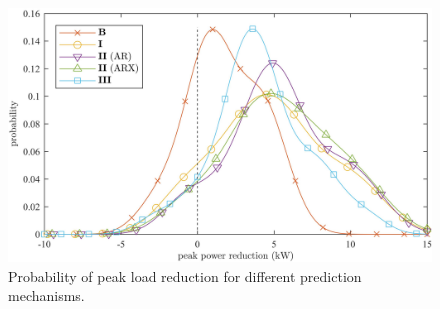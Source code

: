 \begin{figure}\centering
	\includegraphics{_chapter2/fig/difference-pdf-1-avg}
	\caption{Probability of peak load reduction for different prediction mechanisms.}
	\label{ch2:fig:peak-diff-pdf}
\end{figure}